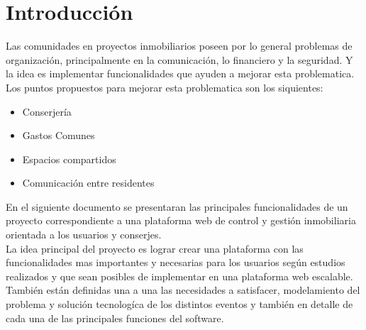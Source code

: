 \chapter{Introducción}
Las comunidades en proyectos inmobiliarios poseen por lo general problemas de organización, principalmente en la comunicación, lo financiero y la seguridad. Y la idea es implementar funcionalidades que ayuden a mejorar esta problematica.\\
Los puntos propuestos para mejorar esta problematica son los siquientes:
\begin{itemize}
\item Conserjería
\item Gastos Comunes
\item Espacios compartidos
\item Comunicación entre residentes 
\end{itemize}
En el siguiente documento se presentaran las principales funcionalidades de un proyecto correspondiente a una plataforma web de control y gestión inmobiliaria orientada a los usuarios y conserjes.\\
La idea principal del proyecto es lograr crear una plataforma con las funcionalidades mas importantes y necesarias para los usuarios según estudios realizados y que sean posibles de implementar en una plataforma web escalable.\\
También están definidas una a una las necesidades a satisfacer, modelamiento del problema y solución tecnologíca de los distintos eventos y también en detalle de cada una de las principales funciones del software.
